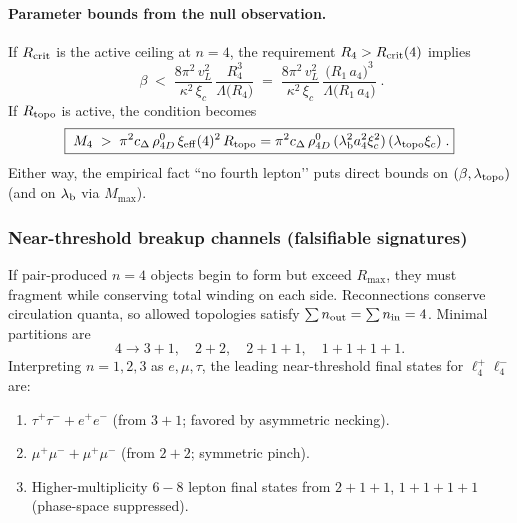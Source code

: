 \paragraph{Parameter bounds from the null observation.}
If \(R_{\rm crit}\) is the active ceiling at \(n{=}4\), the requirement \(R_4>R_{\rm crit}(4)\) implies
\begin{equation}
\boxed{\;
\beta \;<\; \frac{8\pi^{2}\,v_L^{2}}{\kappa^{2}\,\xi_c}\,
\frac{R_4^{3}}{\Lambda\big(R_4\big)}
\;=\; \frac{8\pi^{2}\,v_L^{2}}{\kappa^{2}\,\xi_c}\,
\frac{\big(R_1\,a_4\big)^{3}}{\Lambda\big(R_1\,a_4\big)}\;.
}
\label{eq:betabound}
\end{equation}
If \(R_{\rm topo}\) is active, the condition becomes
\begin{equation}
\boxed{\;
M_4\;>\;\pi^2 c_\Delta\,\rho_{4D}^0\,\xi_{\rm eff}(4)^{2}\,R_{\rm topo}
=\pi^2 c_\Delta\,\rho_{4D}^0\,(\lambda_{\rm b}^2 a_4^2 \xi_c^2)\,(\lambda_{\rm topo}\xi_c)\;.
}
\label{eq:topobound}
\end{equation}
Either way, the empirical fact “no fourth lepton’’ puts direct bounds on \((\beta,\lambda_{\rm topo})\) (and on \(\lambda_{\rm b}\) via \(M_{\max}\)).

\subsubsection{Near-threshold breakup channels (falsifiable signatures)}
If pair-produced \(n{=}4\) objects begin to form but exceed \(R_{\max}\), they must fragment while conserving total winding on each side. Reconnections conserve circulation quanta, so allowed topologies satisfy \(\sum n_{\rm out}=\sum n_{\rm in}=4\). Minimal partitions are
\[
4 \to 3{+}1,\quad 2{+}2,\quad 2{+}1{+}1,\quad 1{+}1{+}1{+}1.
\]
Interpreting \(n{=}1,2,3\) as \(e,\mu,\tau\), the leading near-threshold final states for \(\ell_4^+\ell_4^-\) are:

\begin{enumerate}
\item \(\tau^+\tau^- + e^+e^-\) (from \(3{+}1\); favored by asymmetric necking).
\item \(\mu^+\mu^- + \mu^+\mu^-\) (from \(2{+}2\); symmetric pinch).
\item Higher-multiplicity \(6\!-\!8\) lepton final states from \(2{+}1{+}1\), \(1{+}1{+}1{+}1\) (phase-space suppressed).
\end{enumerate}


